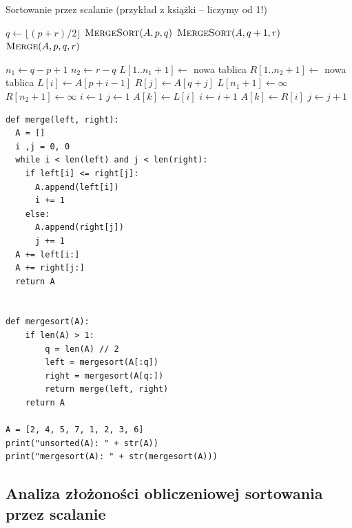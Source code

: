 \documentclass[10pt, oneside]{article}
\theoremstyle{remark}
\begin{document}
\begin{algorithm}
    \caption{Sortowanie przez scalanie (przykład z książki -- liczymy od 1!)}
    \label{merge_sort}
    \begin{algorithmic}[1] %
            		\State $q \gets \lfloor (p + r)/2 \rfloor$
            		\State $\Call{MergeSort}{A, p, q}$
            		\State $\Call{MergeSort}{A, q+1, r}$
            		\State $\Call{Merge}{A, p, q, r}$
            	\EndIf
        \EndFunction
        
            	\State $n_1 \gets q -p + 1$
            	\State $n_2 \gets r-q$
            	\State $L[1..n_{1}+1] \gets$ nowa tablica
            	\State $R[1..n_{2}+1] \gets$ nowa tablica
            		\State $L[i] \gets A[p+i-1]$ 
            	\EndFor
            		\State $R[j] \gets A[q+j]$ 
            	\EndFor
            	\State $L[n_1 + 1] \gets \infty$
            	\State $R[n_2 + 1] \gets \infty$
            	\State $i \gets 1$
            	\State $j \gets 1$
            			\State $A[k] \gets L[i]$
            			\State $i \gets i + 1$
            		\Else{}
            			\State $A[k] \gets R[i]$
            			\State $j \gets j + 1$
            		\EndIf
            	\EndFor
        \EndFunction
    \end{algorithmic}
\end{algorithm}

\begin{verbatim}
def merge(left, right):
  A = []
  i ,j = 0, 0
  while i < len(left) and j < len(right):
    if left[i] <= right[j]:
      A.append(left[i])
      i += 1
    else:
      A.append(right[j])
      j += 1
  A += left[i:]
  A += right[j:]
  return A


def mergesort(A):
	if len(A) > 1:
		q = len(A) // 2
		left = mergesort(A[:q])
		right = mergesort(A[q:])
		return merge(left, right)
	return A
	
A = [2, 4, 5, 7, 1, 2, 3, 6]
print("unsorted(A): " + str(A))
print("mergesort(A): " + str(mergesort(A)))
\end{verbatim}

\subsection{Analiza złożoności obliczeniowej sortowania przez scalanie}
\end{document}
